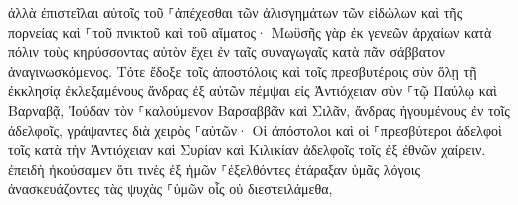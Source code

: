 \documentclass{openreader}
\begin{document}
ἀλλὰ ἐπιστεῖλαι αὐτοῖς τοῦ ⸀ἀπέχεσθαι τῶν ἀλισγημάτων τῶν εἰδώλων καὶ τῆς πορνείας καὶ ⸀τοῦ πνικτοῦ καὶ τοῦ αἵματος· 
Μωϋσῆς γὰρ ἐκ γενεῶν ἀρχαίων κατὰ πόλιν τοὺς κηρύσσοντας αὐτὸν ἔχει ἐν ταῖς συναγωγαῖς κατὰ πᾶν σάββατον ἀναγινωσκόμενος. 
Τότε ἔδοξε τοῖς ἀποστόλοις καὶ τοῖς πρεσβυτέροις σὺν ὅλῃ τῇ ἐκκλησίᾳ ἐκλεξαμένους ἄνδρας ἐξ αὐτῶν πέμψαι εἰς Ἀντιόχειαν σὺν ⸀τῷ Παύλῳ καὶ Βαρναβᾷ, Ἰούδαν τὸν ⸀καλούμενον Βαρσαββᾶν καὶ Σιλᾶν, ἄνδρας ἡγουμένους ἐν τοῖς ἀδελφοῖς, 
γράψαντες διὰ χειρὸς ⸀αὐτῶν· Οἱ ἀπόστολοι καὶ οἱ ⸀πρεσβύτεροι ἀδελφοὶ τοῖς κατὰ τὴν Ἀντιόχειαν καὶ Συρίαν καὶ Κιλικίαν ἀδελφοῖς τοῖς ἐξ ἐθνῶν χαίρειν. 
ἐπειδὴ ἠκούσαμεν ὅτι τινὲς ἐξ ἡμῶν ⸀ἐξελθόντες ἐτάραξαν ὑμᾶς λόγοις ἀνασκευάζοντες τὰς ψυχὰς ⸀ὑμῶν οἷς οὐ διεστειλάμεθα, 
\end{document}
